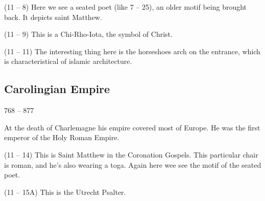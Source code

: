 \documentclass{article}
\begin{document}
\begin{spacing}{1.2}
        (11 -- 8) Here we see a seated poet (like 7 -- 25), an older motif being brought back. It depicts saint Matthew.

        (11 -- 9) This is a Chi-Rho-Iota, the symbol of Christ.

        (11 -- 11) The interesting thing here is the horseshoes arch on the entrance, which is characteristical of islamic architecture.

        \subsection{Carolingian Empire}
        \begin{flushright}
            768 -- 877
        \end{flushright}
        At the death of Charlemagne his empire covered most of Europe. He was the first emperor of the Holy Roman Empire.

        (11 -- 14) This is Saint Matthew in the Coronation Gospels. This particular chair is roman, and he's also wearing a toga. Again here wee see the motif of the seated poet.

        (11 -- 15A) This is the Utrecht Psalter.
    \end{spacing}
\end{document}

